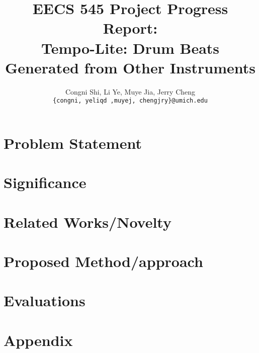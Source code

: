 \documentclass[11pt,letterpaper]{article}
\title{EECS 545 Project Progress Report: \\
        Tempo-Lite: Drum Beats Generated from Other Instruments}
\author{Congni Shi, Li Ye, Muye Jia, Jerry Cheng\\
        \texttt{\{congni, yeliqd ,muyej, chengjry\}@umich.edu}
}
\begin{document}
\maketitle

\section{Problem Statement}
    \label{sec:problem}
    
\section{Significance}
    \label{sec:significance}
    
\section{Related Works/Novelty}
    \label{sec:novelty}
    
\section{Proposed Method/approach}
    \label{sec:approach}
    

\section{Evaluations}
    \label{sec:eval}
    

\section{Appendix}
    \label{sec:app}
    


\nocite{*}

\end{document}
